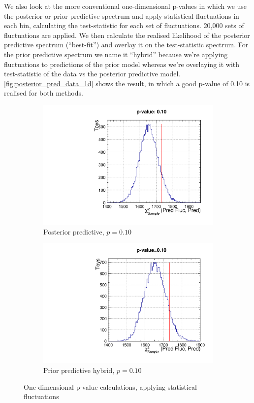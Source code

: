We also look at the more conventional one-dimensional p-values in which we use the posterior or prior predictive spectrum and apply statistical fluctuations in each bin, calculating the test-statistic for each set of fluctuations. 20,000 sets of fluctuations are applied. We then calculate the realised likelihood of the posterior predictive spectrum (``best-fit'') and overlay it on the test-statistic spectrum. For the prior predictive spectrum we name it ``hybrid'' because we're applying fluctuations to predictions of the prior model whereas we're overlaying it with test-statistic of the data vs the posterior predictive model. \autoref{fig:posterior_pred_data_1d} shows the result, in which a good p-value of 0.10 is realised for both methods.
\begin{figure}[h]
	\begin{subfigure}[t]{0.49\textwidth}
		\includegraphics[width=\textwidth, trim={0mm 0mm 0mm 14mm}, clip,page=1]{figures/mach3/data/postpred/postpred_pvalue_1d}
		\caption{Posterior predictive, $p=0.10$}
	\end{subfigure}
	\begin{subfigure}[t]{0.49\textwidth}
		\includegraphics[width=\textwidth, trim={0mm 0mm 0mm 14mm}, clip,page=1]{figures/mach3/data/postpred/PriorPredictive_Hybrid}
		\caption{Prior predictive hybrid, $p=0.10$}
	\end{subfigure}
	\caption{One-dimensional p-value calculations, applying statistical fluctuations}
	\label{fig:posterior_pred_data_1d}
\end{figure}


